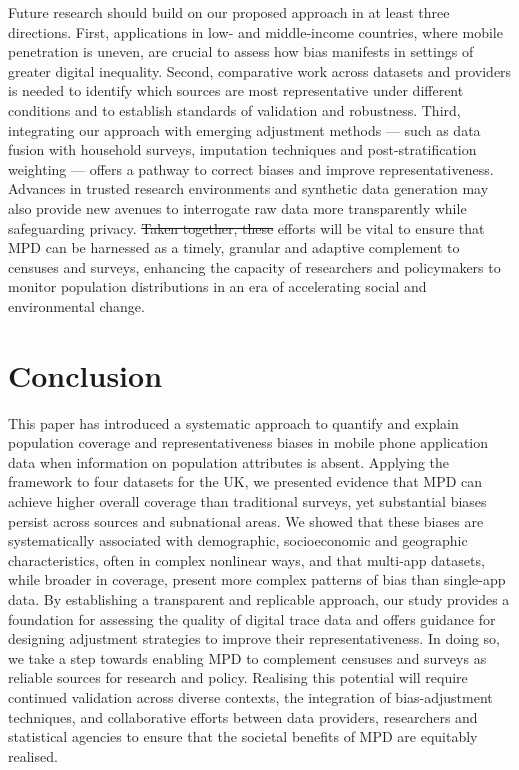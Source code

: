 \documentclass[]{rsos}%
\providecommand{\DIFadd}[1]{{\protect\color{blue}\uwave{#1}}} %
\providecommand{\DIFdel}[1]{{\protect\color{red}\sout{#1}}}                      %
\providecommand{\DIFaddbegin}{} %
\providecommand{\DIFaddend}{} %
\providecommand{\DIFdelbegin}{} %
\providecommand{\DIFdelend}{} %
\begin{document}
Future research should build on our proposed approach in at least three
directions. First, applications in low- and middle-income countries,
where mobile penetration is uneven, are crucial to assess how bias
manifests in settings of greater digital inequality. Second, comparative
work across datasets and providers is needed to identify which sources
are most representative under different conditions and to establish
standards of validation and robustness. Third, integrating our approach
with emerging adjustment methods --- such as data fusion with household
surveys, imputation techniques and post-stratification weighting ---
offers a pathway to correct biases and improve representativeness.
Advances in trusted research environments and synthetic data generation
may also provide new avenues to interrogate raw data more transparently
while safeguarding privacy. \DIFdelbegin \DIFdel{Taken together, these }\DIFdelend \DIFaddbegin \DIFadd{These }\DIFaddend efforts will be vital to ensure that
MPD can be harnessed as a timely, granular and adaptive complement to
censuses and surveys, enhancing the capacity of researchers and
policymakers to monitor population distributions in an era of
accelerating social and environmental change.

\section{Conclusion}\label{conclusion}

This paper has introduced a systematic approach to quantify and explain
population coverage and representativeness biases in mobile phone
application data when information on population attributes is absent.
Applying the framework to four datasets for the UK, we presented
evidence that MPD can achieve higher overall coverage than traditional
surveys, yet substantial biases persist across sources and subnational
areas. We showed that these biases are systematically associated with
demographic, socioeconomic and geographic characteristics, often in
complex nonlinear ways, and that multi-app datasets, while broader in
coverage, present more complex patterns of bias than single-app data. By
establishing a transparent and replicable approach, our study provides a
foundation for assessing the quality of digital trace data and offers
guidance for designing adjustment strategies to improve their
representativeness. In doing so, we take a step towards enabling MPD to
complement censuses and surveys as reliable sources for research and
policy. Realising this potential will require continued validation
across diverse contexts, the integration of bias-adjustment techniques,
and collaborative efforts between data providers, researchers and
statistical agencies to ensure that the societal benefits of MPD are
equitably realised.
\end{document}
